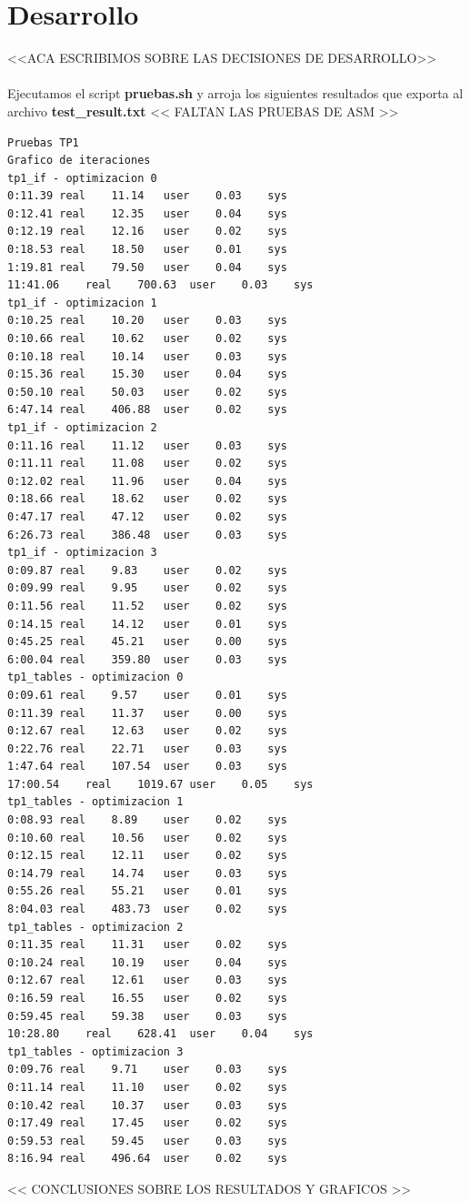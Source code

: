 \documentclass[a4paper, 10pt, twoside, notitlepage]{article}
\begin{document}
\newpage
\section{Desarrollo}
<<ACA ESCRIBIMOS SOBRE LAS DECISIONES DE DESARROLLO>> \\
\\

Ejecutamos el script \textbf{pruebas.sh} y arroja los siguientes resultados que exporta al archivo \textbf{test_result.txt}
<< FALTAN LAS PRUEBAS DE ASM >>
\scriptsize
\begin{verbatim}
Pruebas TP1
Grafico de iteraciones
tp1_if - optimizacion 0
0:11.39	real	11.14	user	0.03	sys
0:12.41	real	12.35	user	0.04	sys
0:12.19	real	12.16	user	0.02	sys
0:18.53	real	18.50	user	0.01	sys
1:19.81	real	79.50	user	0.04	sys
11:41.06	real	700.63	user	0.03	sys
tp1_if - optimizacion 1
0:10.25	real	10.20	user	0.03	sys
0:10.66	real	10.62	user	0.02	sys
0:10.18	real	10.14	user	0.03	sys
0:15.36	real	15.30	user	0.04	sys
0:50.10	real	50.03	user	0.02	sys
6:47.14	real	406.88	user	0.02	sys
tp1_if - optimizacion 2
0:11.16	real	11.12	user	0.03	sys
0:11.11	real	11.08	user	0.02	sys
0:12.02	real	11.96	user	0.04	sys
0:18.66	real	18.62	user	0.02	sys
0:47.17	real	47.12	user	0.02	sys
6:26.73	real	386.48	user	0.03	sys
tp1_if - optimizacion 3
0:09.87	real	9.83	user	0.02	sys
0:09.99	real	9.95	user	0.02	sys
0:11.56	real	11.52	user	0.02	sys
0:14.15	real	14.12	user	0.01	sys
0:45.25	real	45.21	user	0.00	sys
6:00.04	real	359.80	user	0.03	sys
tp1_tables - optimizacion 0
0:09.61	real	9.57	user	0.01	sys
0:11.39	real	11.37	user	0.00	sys
0:12.67	real	12.63	user	0.02	sys
0:22.76	real	22.71	user	0.03	sys
1:47.64	real	107.54	user	0.03	sys
17:00.54	real	1019.67	user	0.05	sys
tp1_tables - optimizacion 1
0:08.93	real	8.89	user	0.02	sys
0:10.60	real	10.56	user	0.02	sys
0:12.15	real	12.11	user	0.02	sys
0:14.79	real	14.74	user	0.03	sys
0:55.26	real	55.21	user	0.01	sys
8:04.03	real	483.73	user	0.02	sys
tp1_tables - optimizacion 2
0:11.35	real	11.31	user	0.02	sys
0:10.24	real	10.19	user	0.04	sys
0:12.67	real	12.61	user	0.03	sys
0:16.59	real	16.55	user	0.02	sys
0:59.45	real	59.38	user	0.03	sys
10:28.80	real	628.41	user	0.04	sys
tp1_tables - optimizacion 3
0:09.76	real	9.71	user	0.03	sys
0:11.14	real	11.10	user	0.02	sys
0:10.42	real	10.37	user	0.03	sys
0:17.49	real	17.45	user	0.02	sys
0:59.53	real	59.45	user	0.03	sys
8:16.94	real	496.64	user	0.02	sys
\end{verbatim}
\normalsize

<< CONCLUSIONES SOBRE LOS RESULTADOS Y GRAFICOS >>
\\
\\
\end{document}
